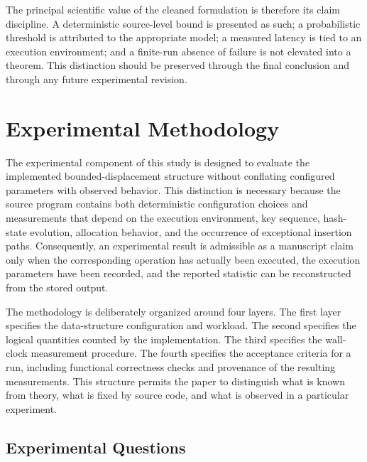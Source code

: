 \documentclass[conference]{IEEEtran}
\begin{document}
The principal scientific value of the cleaned formulation is therefore its
claim discipline. A deterministic source-level bound is presented as such; a
probabilistic threshold is attributed to the appropriate model; a measured
latency is tied to an execution environment; and a finite-run absence of
failure is not elevated into a theorem. This distinction should be preserved
through the final conclusion and through any future experimental revision.




\section{Experimental Methodology}
\label{sec:experimental-methodology}

The experimental component of this study is designed to evaluate the implemented
bounded-displacement structure without conflating configured parameters with
observed behavior. This distinction is necessary because the source program
contains both deterministic configuration choices and measurements that depend
on the execution environment, key sequence, hash-state evolution, allocation
behavior, and the occurrence of exceptional insertion paths. Consequently, an
experimental result is admissible as a manuscript claim only when the
corresponding operation has actually been executed, the execution parameters
have been recorded, and the reported statistic can be reconstructed from the
stored output.

The methodology is deliberately organized around four layers. The first layer
specifies the data-structure configuration and workload. The second specifies
the logical quantities counted by the implementation. The third specifies the
wall-clock measurement procedure. The fourth specifies the acceptance criteria
for a run, including functional correctness checks and provenance of the
resulting measurements. This structure permits the paper to distinguish what
is known from theory, what is fixed by source code, and what is observed in a
particular experiment.

\subsection{Experimental Questions}
\end{document}
